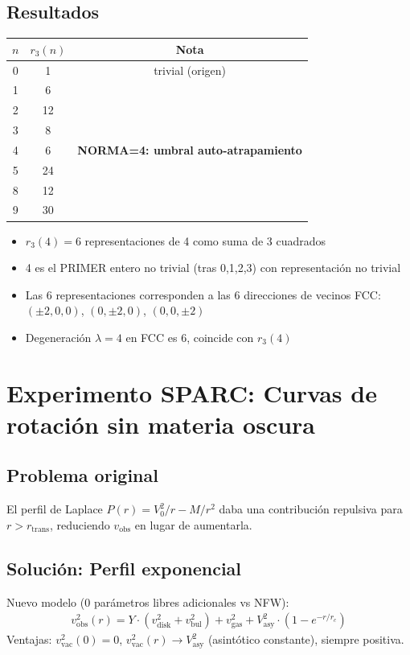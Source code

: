 \documentclass[12pt]{article}
\begin{document}
\subsection{Resultados}
\begin{center}
\begin{tabular}{ccc}
\toprule
$n$ & $r_3(n)$ & Nota \\
\midrule
0 & 1 & trivial (origen) \\
1 & 6 & \\
2 & 12 & \\
3 & 8 & \\
4 & 6 & \textbf{NORMA=4: umbral auto-atrapamiento} \\
5 & 24 & \\
8 & 12 & \\
9 & 30 & \\
\bottomrule
\end{tabular}
\end{center}

\begin{itemize}
  \item $r_3(4) = 6$ representaciones de 4 como suma de 3 cuadrados
  \item 4 es el PRIMER entero no trivial (tras 0,1,2,3) con representaci\'on no trivial
  \item Las 6 representaciones corresponden a las 6 direcciones de vecinos FCC: $(\pm 2,0,0)$, $(0,\pm 2,0)$, $(0,0,\pm 2)$
  \item Degeneraci\'on $\lambda=4$ en FCC es 6, coincide con $r_3(4)$
\end{itemize}

\section{Experimento SPARC: Curvas de rotaci\'on sin materia oscura}

\subsection{Problema original}
El perfil de Laplace $P(r) = V_0^2/r - M/r^2$ daba una contribuci\'on repulsiva para $r>r_{\text{trans}}$, reduciendo $v_{\text{obs}}$ en lugar de aumentarla.

\subsection{Soluci\'on: Perfil exponencial}
Nuevo modelo (0 par\'ametros libres adicionales vs NFW):
\begin{align}
  v_{\text{obs}}^2(r) = Y\cdot(v_{\text{disk}}^2+v_{\text{bul}}^2) + v_{\text{gas}}^2 + V_{\text{asy}}^2\cdot(1-e^{-r/r_c})
\end{align}
Ventajas: $v_{\text{vac}}^2(0)=0$, $v_{\text{vac}}^2(r)\to V_{\text{asy}}^2$ (asint\'otico constante), siempre positiva.
\end{document}
